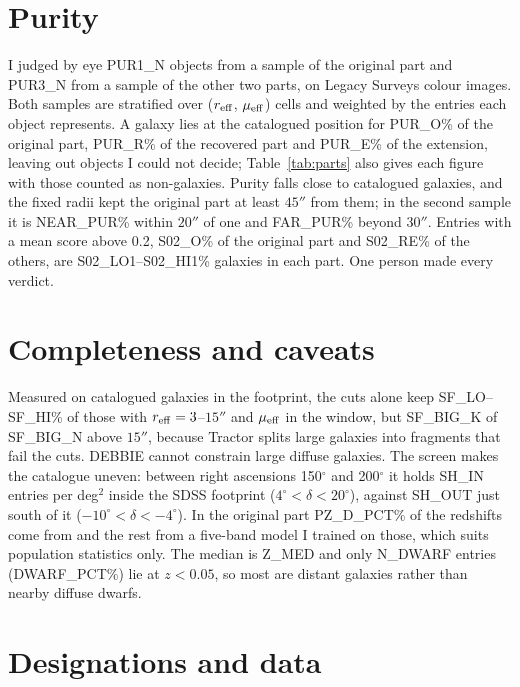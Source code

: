 \documentclass{aastex701}
\begin{document}
\section{Purity}

I judged by eye {{PUR1_N}} objects from a sample of the original part and
{{PUR3_N}} from a sample of the other two parts, on Legacy Surveys colour images. Both samples are stratified over
($r_{\rm eff}$, $\mu_{\rm eff}$) cells and weighted by the entries each object
represents. A galaxy lies at the catalogued position for {{PUR_O}}\% of the
original part, {{PUR_R}}\% of the recovered part and {{PUR_E}}\% of the
extension, leaving out objects I could not decide; Table~\ref{tab:parts} also
gives each figure with those counted as non-galaxies. Purity falls close to
catalogued galaxies, and the fixed radii kept the original part at least $45''$
from them; in the second sample it is {{NEAR_PUR}}\% within $20''$ of one and
{{FAR_PUR}}\% beyond $30''$.
Entries with a mean score above 0.2, {{S02_O}}\% of the original part and
{{S02_RE}}\% of the others, are {{S02_LO1}}--{{S02_HI1}}\% galaxies in each part. One
person made every verdict.

\section{Completeness and caveats}

Measured on catalogued galaxies in the footprint, the cuts alone keep
{{SF_LO}}--{{SF_HI}}\% of those with $r_{\rm eff} = 3$--$15''$ and
$\mu_{\rm eff}$ in the window, but {{SF_BIG_K}} of {{SF_BIG_N}} above $15''$,
because Tractor splits large galaxies into fragments that fail the cuts. DEBBIE
cannot constrain large diffuse galaxies. The screen makes the catalogue uneven:
between right ascensions 150$^\circ$ and 200$^\circ$ it holds {{SH_IN}} entries
per deg$^2$ inside the SDSS footprint ($4^\circ < \delta < 20^\circ$), against
{{SH_OUT}} just south of it ($-10^\circ < \delta < -4^\circ$). In the original
part {{PZ_D_PCT}}\% of the redshifts come from \citet{duncan2022} and the rest
from a five-band model I trained on those, which suits population statistics
only. The median is {{Z_MED}} and only {{N_DWARF}} entries ({{DWARF_PCT}}\%) lie
at $z < 0.05$, so most are distant galaxies rather than nearby diffuse dwarfs.

\section{Designations and data}
\end{document}
